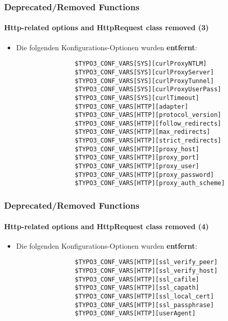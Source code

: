 \begin{frame}[fragile]
	\frametitle{Deprecated/Removed Functions}
	\framesubtitle{Http-related options and HttpRequest class removed (3)}

	\begin{itemize}

		\item Die folgenden Konfigurations-Optionen wurden \textbf{entfernt}:
			\begin{lstlisting}
				$TYPO3_CONF_VARS[SYS][curlProxyNTLM]
				$TYPO3_CONF_VARS[SYS][curlProxyServer]
				$TYPO3_CONF_VARS[SYS][curlProxyTunnel]
				$TYPO3_CONF_VARS[SYS][curlProxyUserPass]
				$TYPO3_CONF_VARS[SYS][curlTimeout]
				$TYPO3_CONF_VARS[HTTP][adapter]
				$TYPO3_CONF_VARS[HTTP][protocol_version]
				$TYPO3_CONF_VARS[HTTP][follow_redirects]
				$TYPO3_CONF_VARS[HTTP][max_redirects]
				$TYPO3_CONF_VARS[HTTP][strict_redirects]
				$TYPO3_CONF_VARS[HTTP][proxy_host]
				$TYPO3_CONF_VARS[HTTP][proxy_port]
				$TYPO3_CONF_VARS[HTTP][proxy_user]
				$TYPO3_CONF_VARS[HTTP][proxy_password]
				$TYPO3_CONF_VARS[HTTP][proxy_auth_scheme]
			\end{lstlisting}
	\end{itemize}

\end{frame}


\begin{frame}[fragile]
	\frametitle{Deprecated/Removed Functions}
	\framesubtitle{Http-related options and HttpRequest class removed (4)}

	\begin{itemize}

		\item Die folgenden Konfigurations-Optionen wurden \textbf{entfernt}:
			\begin{lstlisting}
				$TYPO3_CONF_VARS[HTTP][ssl_verify_peer]
				$TYPO3_CONF_VARS[HTTP][ssl_verify_host]
				$TYPO3_CONF_VARS[HTTP][ssl_cafile]
				$TYPO3_CONF_VARS[HTTP][ssl_capath]
				$TYPO3_CONF_VARS[HTTP][ssl_local_cert]
				$TYPO3_CONF_VARS[HTTP][ssl_passphrase]
				$TYPO3_CONF_VARS[HTTP][userAgent]
			\end{lstlisting}
	\end{itemize}

\end{frame}


